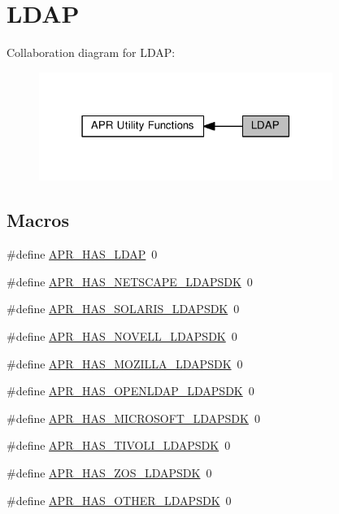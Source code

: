 \hypertarget{group__APR__Util__LDAP}{}\section{L\+D\+AP}
\label{group__APR__Util__LDAP}
Collaboration diagram for L\+D\+AP\+:
\nopagebreak
\begin{figure}[H]
\begin{center}
\leavevmode
\includegraphics[width=271pt]{group__APR__Util__LDAP}
\end{center}
\end{figure}
\subsection*{Macros}
\begin{DoxyCompactItemize}
\item 
\#define \hyperlink{group__APR__Util__LDAP_gaf8d199208a26c4ee4c6db46764675f01}{A\+P\+R\+\_\+\+H\+A\+S\+\_\+\+L\+D\+AP}~0
\item 
\#define \hyperlink{group__APR__Util__LDAP_ga5ee3703cda47ea3fa8bb82b94341742c}{A\+P\+R\+\_\+\+H\+A\+S\+\_\+\+N\+E\+T\+S\+C\+A\+P\+E\+\_\+\+L\+D\+A\+P\+S\+DK}~0
\item 
\#define \hyperlink{group__APR__Util__LDAP_gadfd79510be01b585d07d3a0cf517377a}{A\+P\+R\+\_\+\+H\+A\+S\+\_\+\+S\+O\+L\+A\+R\+I\+S\+\_\+\+L\+D\+A\+P\+S\+DK}~0
\item 
\#define \hyperlink{group__APR__Util__LDAP_ga61438dcd7b6c386fab3b3da59c884f2c}{A\+P\+R\+\_\+\+H\+A\+S\+\_\+\+N\+O\+V\+E\+L\+L\+\_\+\+L\+D\+A\+P\+S\+DK}~0
\item 
\#define \hyperlink{group__APR__Util__LDAP_ga6e9f26af3e9801f4f3dfb6ccb51ab4fe}{A\+P\+R\+\_\+\+H\+A\+S\+\_\+\+M\+O\+Z\+I\+L\+L\+A\+\_\+\+L\+D\+A\+P\+S\+DK}~0
\item 
\#define \hyperlink{group__APR__Util__LDAP_ga53eb8a677574757eab3aeef411c79e82}{A\+P\+R\+\_\+\+H\+A\+S\+\_\+\+O\+P\+E\+N\+L\+D\+A\+P\+\_\+\+L\+D\+A\+P\+S\+DK}~0
\item 
\#define \hyperlink{group__APR__Util__LDAP_ga4d353111e4fc3f79a7a9a4d9a37b4099}{A\+P\+R\+\_\+\+H\+A\+S\+\_\+\+M\+I\+C\+R\+O\+S\+O\+F\+T\+\_\+\+L\+D\+A\+P\+S\+DK}~0
\item 
\#define \hyperlink{group__APR__Util__LDAP_gad46b9586b73ac6e51a02831275f8b04e}{A\+P\+R\+\_\+\+H\+A\+S\+\_\+\+T\+I\+V\+O\+L\+I\+\_\+\+L\+D\+A\+P\+S\+DK}~0
\item 
\#define \hyperlink{group__APR__Util__LDAP_gaaf7c4fb35087815ead3905b61df10791}{A\+P\+R\+\_\+\+H\+A\+S\+\_\+\+Z\+O\+S\+\_\+\+L\+D\+A\+P\+S\+DK}~0
\item 
\#define \hyperlink{group__APR__Util__LDAP_ga23badc30790c00670f7d32485aef644f}{A\+P\+R\+\_\+\+H\+A\+S\+\_\+\+O\+T\+H\+E\+R\+\_\+\+L\+D\+A\+P\+S\+DK}~0
\end{DoxyCompactItemize}


